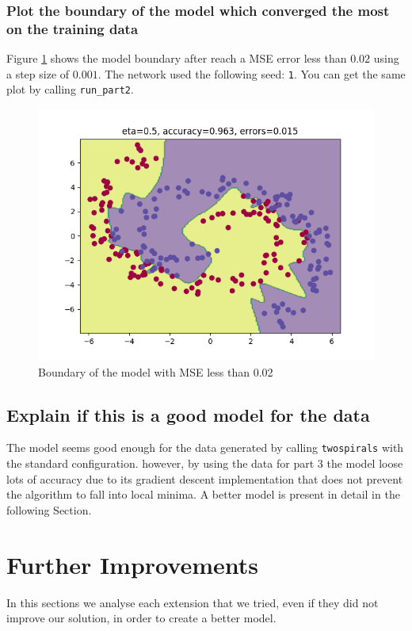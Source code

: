 \documentclass[11pt]{article}
\begin{document}
\subsubsection{Plot the boundary of the model which converged the most on the training data}
Figure \ref{fig: NN_MSE_002_boundary} shows the model boundary after reach a MSE error less than $0.02$ using a step size of $0.001$. The network used the following seed: \texttt{1}. You can get the same plot by calling \texttt{run\_part2}.
\begin{figure}[H]
\centering
\includegraphics[scale=0.6]{images/NN_boundary_vs_learning_rates/0}	
\caption{Boundary of the model with MSE less than 0.02}
\label{fig: NN_MSE_002_boundary}
\end{figure}
 \subsection{Explain if this is a good model for the data}
The model seems good enough for the data generated by calling \texttt{twospirals} with the standard configuration. however, by using the data for part 3 the model loose lots of accuracy due to its gradient descent implementation that does not prevent the algorithm to fall into local minima. 
A better model is present in detail in the following Section.
\section{Further Improvements}
In this sections we analyse each extension that we tried, even if they did not improve our solution, in order to create a better model.
\end{document}
